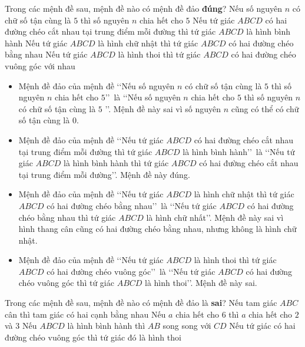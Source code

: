 \begin{ex}%
	Trong các mệnh đề sau, mệnh đề nào có mệnh đề đảo \textbf{đúng}?
	\choice
	{Nếu số nguyên $n$ có chữ số tận cùng là $5$ thì số nguyên $n$ chia hết cho $5$}
	{\True Nếu tứ giác $ABCD$ có hai đường chéo cắt nhau tại trung điểm mỗi đường thì tứ giác $ABCD$ là hình bình hành}
	{Nếu tứ giác $ABCD$ là hình chữ nhật thì tứ giác $ABCD$ có hai đường chéo bằng nhau}
	{Nếu tứ giác $ABCD$ là hình thoi thì tứ giác $ABCD$ có hai đường chéo vuông góc với nhau}
	\loigiai
	{
		\begin{itemize}
			\item Mệnh đề đảo của mệnh đề \lq\lq Nếu số nguyên $n$ có chữ số tận cùng là $5$ thì số nguyên $n$ chia hết cho $5$\rq\rq\, là \lq\lq Nếu số nguyên $n$ chia hết cho $5$ thì số nguyên $n$ có chữ số tận cùng là $5$ \rq\rq. Mệnh đề này sai vì số nguyên $n$ cũng có thể có chữ số tận cùng là $0$.
			\item Mệnh đề đảo của mệnh đề \lq\lq Nếu tứ giác $ABCD$ có hai đường chéo cắt nhau tại trung điểm mỗi đường thì tứ giác $ABCD$ là hình bình hành\rq\rq\, là \lq\lq Nếu tứ giác $ABCD$ là hình bình hành thì tứ giác $ABCD$ có hai đường chéo cắt nhau tại trung điểm mỗi đường\rq\rq. Mệnh đề này đúng.
			\item Mệnh đề đảo của mệnh đề \lq\lq Nếu tứ giác $ABCD$ là hình chữ nhật thì tứ giác $ABCD$ có hai đường chéo bằng nhau\rq\rq\, là \lq\lq Nếu tứ giác $ABCD$ có hai đường chéo bằng nhau thì tứ giác $ABCD$ là hình chữ nhất\rq\rq. Mệnh đề này sai vì hình thang cân cũng có hai đường chéo bằng nhau, nhưng không là hình chữ nhật.
			\item Mệnh đề đảo của mệnh đề \lq\lq Nếu tứ giác $ABCD$ là hình thoi thì tứ giác $ABCD$ có hai đường chéo vuông góc\rq\rq\, là \lq\lq Nếu tứ giác $ABCD$ có hai đường chéo vuông góc thì tứ giác $ABCD$ là hình thoi\rq\rq. Mệnh đề này sai.
		\end{itemize}
	}
\end{ex}
\begin{ex}%
	Trong các mệnh đề sau, mệnh đề nào có mệnh đề đảo là \textbf{sai}?
	\choice
	{Nếu tam giác $ABC$ cân thì tam giác có hai cạnh bằng nhau}
	{Nếu $ a$ chia hết cho $6$ thì $ a$ chia hết cho $2$ và $3$}
	{\True Nếu $ABCD$ là hình bình hành thì $AB$ song song với $CD$}
	{Nếu tứ giác có hai đường chéo vuông góc thì tứ giác đó là hình thoi}
\end{ex}
